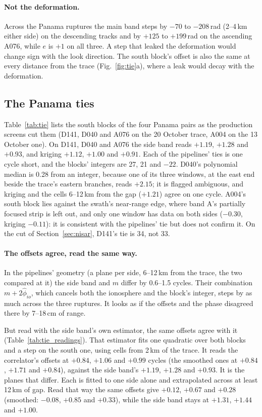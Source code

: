 \paragraph{Not the deformation.} Across the Panama ruptures the main band steps by $-70$ to $-208$\,rad (2--4\,km
either side) on the descending tracks and by $+125$ to $+199$\,rad on the ascending A076, while $e$ is $+1$ on all
three. A step that leaked the deformation would change sign with the look direction. The south block's offset is also
the same at every distance from the trace (Fig.~\ref{fig:tie}a), where a leak would decay with the deformation.

\subsection{The Panama ties}
\label{sec:panamaties}
Table~\ref{tab:tie} lists the south blocks of the four Panama pairs as the production screens cut them (D141, D040 and
A076 on the 20 October trace, A004 on the 13 October one). On D141, D040 and A076 the side band reads $+1.19$, $+1.28$
and $+0.93$, and kriging $+1.12$, $+1.00$ and $+0.91$. Each of the pipelines' ties is one cycle short, and the blocks'
integers are 27, 21 and $-22$. D040's polynomial median is 0.28 from an integer, because one of its three windows, at the east
end beside the trace's eastern branches, reads $+2.15$; it is flagged ambiguous, and kriging and the cells 6--12\,km from the gap
($+1.21$) agree on one cycle. A004's south block lies against the swath's near-range edge, where band A's partially
focused strip is left out, and only one window has data on both sides ($-0.30$, kriging $-0.11$): it is consistent with
the pipelines' tie but does not confirm it. On the cut of Section~\ref{sec:nisar}, D141's tie is 34, not 33.

\paragraph{The offsets agree, read the same way.} In the pipelines' geometry (a plane per side, 6--12\,km from the
trace, the two compared at it) the side band and $m$ differ by 0.6--1.5 cycles. Their combination $m + 2\hat\phi_{io}$,
which cancels both the ionosphere and the block's integer, steps by as much across the three ruptures. It looks as if
the offsets and the phase disagreed there by 7--18\,cm of range.

But read with the side band's own estimator, the same offsets agree with it (Table~\ref{tab:tie_readings}). That
estimator fits one quadratic over both blocks and a step on the south one, using cells from 2\,km of the trace. It reads
the correlator's offsets at $+0.84$, $+1.06$ and $+0.99$ cycles (the smoothed ones at $+0.84$, $+1.71$ and $+0.84$),
against the side band's $+1.19$, $+1.28$ and $+0.93$. It is the planes that differ. Each is fitted to one side alone and
extrapolated across at least 12\,km of gap. Read that way the same offsets give $+0.12$, $+0.67$ and $+0.28$ (smoothed:
$-0.08$, $+0.85$ and $+0.33$), while the side band stays at $+1.31$, $+1.44$ and $+1.00$.

